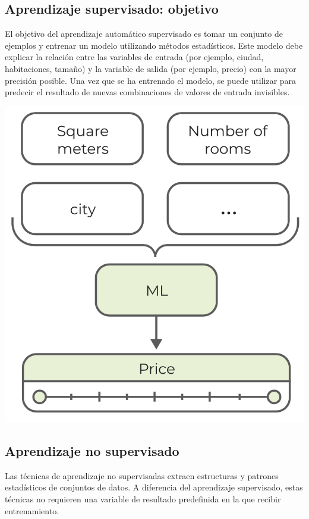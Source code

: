 \documentclass[
]{book}
\begin{document}
\hypertarget{aprendizaje-supervisado-objetivo}{%
\subsection{Aprendizaje supervisado: objetivo}\label{aprendizaje-supervisado-objetivo}}

El objetivo del aprendizaje automático supervisado es tomar un conjunto de ejemplos y entrenar un modelo utilizando métodos estadísticos. Este modelo debe explicar la relación entre las variables de entrada (por ejemplo, ciudad, habitaciones, tamaño) y la variable de salida (por ejemplo, precio) con la mayor precisión posible. Una vez que se ha entrenado el modelo, se puede utilizar para predecir el resultado de nuevas combinaciones de valores de entrada invisibles.

\includegraphics{img/sup.png}

\hypertarget{aprendizaje-no-supervisado}{%
\subsection{Aprendizaje no supervisado}\label{aprendizaje-no-supervisado}}

Las técnicas de aprendizaje no supervisadas extraen estructuras y patrones estadísticos de conjuntos de datos. A diferencia del aprendizaje supervisado, estas técnicas no requieren una variable de resultado predefinida en la que recibir entrenamiento.
\end{document}
